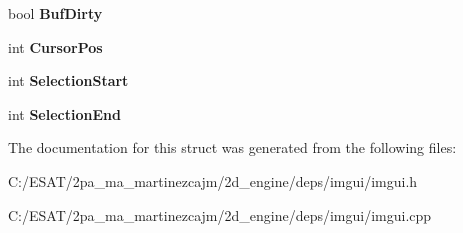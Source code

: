 \begin{DoxyCompactItemize}
\mbox{\label{struct_im_gui_text_edit_callback_data_a1ba304d589e00bece6400d43451d864e}} 
bool {\bfseries Buf\+Dirty}
\item 
\mbox{\label{struct_im_gui_text_edit_callback_data_aded0e6e87c2dcb66546ae6298e5a8a01}} 
int {\bfseries Cursor\+Pos}
\item 
\mbox{\label{struct_im_gui_text_edit_callback_data_a1634bec3717f7e386033051cf604efed}} 
int {\bfseries Selection\+Start}
\item 
\mbox{\label{struct_im_gui_text_edit_callback_data_af3371b7f36bd6c2b528b033bdb1785a2}} 
int {\bfseries Selection\+End}
\end{DoxyCompactItemize}


The documentation for this struct was generated from the following files\+:\begin{DoxyCompactItemize}
\item 
C\+:/\+E\+S\+A\+T/2pa\+\_\+ma\+\_\+martinezcajm/2d\+\_\+engine/deps/imgui/imgui.\+h\item 
C\+:/\+E\+S\+A\+T/2pa\+\_\+ma\+\_\+martinezcajm/2d\+\_\+engine/deps/imgui/imgui.\+cpp\end{DoxyCompactItemize}
